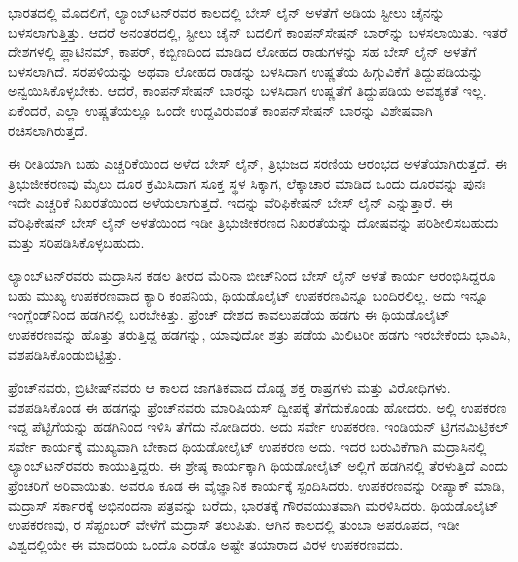 ಭಾರತದಲ್ಲಿ ಮೊದಲಿಗೆ, ಲ್ಯಾಂಬ್​ಟನ್​ರವರ ಕಾಲದಲ್ಲಿ ಬೇಸ್​ ಲೈನ್​ ಅಳತೆಗೆ  ಅಡಿಯ ಸ್ಟೀಲು ಚೈನನ್ನು ಬಳಸಲಾಗುತ್ತಿತ್ತು. ಆದರೆ ಅನಂತರದಲ್ಲಿ, ಸ್ಟೀಲು ಚೈನ್​ ಬದಲಿಗೆ ಕಾಂಪನ್​ಸೇಷನ್​ ಬಾರ್​ನ್ನು ಬಳಸಲಾಯಿತು. ಇತರೆ ದೇಶಗಳಲ್ಲಿ ಪ್ಲಾಟಿನಮ್, ಕಾಪರ್​, ಕಬ್ಬಿಣದಿಂದ ಮಾಡಿದ ಲೋಹದ ರಾಡುಗಳನ್ನು ಸಹ ಬೇಸ್​ ಲೈನ್​ ಅಳತೆಗೆ ಬಳಸಲಾಗಿದೆ. ಸರಪಳಿಯನ್ನು ಅಥವಾ ಲೋಹದ ರಾಡನ್ನು ಬಳಸಿದಾಗ ಉಷ್ಣತೆಯ ಹಿಗ್ಗುವಿಕೆಗೆ ತಿದ್ದುಪಡಿಯನ್ನು ಅನ್ವಯಿಸಿಕೊಳ್ಳಬೇಕು. ಆದರೆ, ಕಾಂಪನ್​ಸೇಷನ್​ ಬಾರನ್ನು ಬಳಸಿದಾಗ ಉಷ್ಣತೆಗೆ ತಿದ್ದುಪಡಿಯ ಅವಶ್ಯಕತೆ ಇಲ್ಲ. ಏಕೆಂದರೆ, ಎಲ್ಲಾ ಉಷ್ಣತೆಯಲ್ಲೂ ಒಂದೇ ಉದ್ದವಿರುವಂತೆ ಕಾಂಪನ್​ಸೇಷನ್​ ಬಾರನ್ನು ವಿಶೇಷವಾಗಿ ರಚಿಸಲಾಗಿರುತ್ತದೆ.

ಈ ರೀತಿಯಾಗಿ ಬಹು ಎಚ್ಚರಿಕೆಯಿಂದ ಅಳೆದ ಬೇಸ್​ ಲೈನ್​, ತ್ರಿಭುಜದ ಸರಣಿಯ ಆರಂಭದ ಅಳತೆಯಾಗಿರುತ್ತದೆ. ಈ ತ್ರಿಭುಜೀಕರಣವು  ಮೈಲು ದೂರ ಕ್ರಮಿಸಿದಾಗ ಸೂಕ್ತ ಸ್ಥಳ ಸಿಕ್ಕಾಗ, ಲೆಕ್ಕಾಚಾರ ಮಾಡಿದ ಒಂದು ದೂರವನ್ನು ಪುನಃ ಇದೇ ಎಚ್ಚರಿಕೆ ನಿಖರತೆಯಿಂದ ಅಳೆಯಲಾಗುತ್ತದೆ. ಇದನ್ನು ವೆರಿಫಿಕೇಷನ್​ ಬೇಸ್​ ಲೈನ್​ ಎನ್ನುತ್ತಾರೆ. ಈ ವೆರಿಫಿಕೇಷನ್​ ಬೇಸ್​ ಲೈನ್​ ಅಳತೆಯಿಂದ ಇಡೀ ತ್ರಿಭುಜೀಕರಣದ ನಿಖರತೆಯನ್ನು ದೋಷವನ್ನು ಪರಿಶೀಲಿಸಬಹುದು ಮತ್ತು ಸರಿಪಡಿಸಿಕೊಳ್ಳಬಹುದು.

ಲ್ಯಾಂಬ್​ಟನ್​ರವರು ಮದ್ರಾಸಿನ ಕಡಲ ತೀರದ ಮೆರಿನಾ ಬೀಚ್​ನಿಂದ ಬೇಸ್​ ಲೈನ್​ ಅಳತೆ ಕಾರ್ಯ ಆರಂಭಿಸಿದ್ದರೂ ಬಹು ಮುಖ್ಯ ಉಪಕರಣವಾದ ಕ್ಯಾರಿ ಕಂಪನಿಯ, ಥಿಯಡೊಲೈಟ್​ ಉಪಕರಣವಿನ್ನೂ ಬಂದಿರಲಿಲ್ಲ. ಅದು ಇನ್ನೂ ಇಂಗ್ಲೆಂಡ್​ನಿಂದ ಹಡಗಿನಲ್ಲಿ ಬರಬೇಕಿತ್ತು. ಫ್ರೆಂಚ್​ ದೇಶದ ಕಾವಲುಪಡೆಯ ಹಡಗು ಈ ಥಿಯಡೊಲೈಟ್​ ಉಪಕರಣವನ್ನು ಹೊತ್ತು ತರುತ್ತಿದ್ದ ಹಡಗನ್ನು, ಯಾವುದೋ ಶತ್ರು ಪಡೆಯ ಮಿಲಿಟರೀ ಹಡಗು ಇರಬೇಕೆಂದು ಭಾವಿಸಿ, ವಶಪಡಿಸಿಕೊಂಡುಬಿಟ್ಟಿತ್ತು.

ಫ್ರೆಂಚ್​ನವರು, ಬ್ರಿಟೀಷ್​ನವರು ಆ ಕಾಲದ ಜಾಗತಿಕವಾದ ದೊಡ್ಡ ಶಕ್ತ ರಾಷ್ರಗಳು ಮತ್ತು ವಿರೋಧಿಗಳು. ವಶಪಡಿಸಿಕೊಂಡ ಈ ಹಡಗನ್ನು ಫ್ರೆಂಚ್​ನವರು ಮಾರಿಷಿಯಸ್​ ದ್ವೀಪಕ್ಕೆ ತೆಗೆದುಕೊಂಡು ಹೋದರು. ಅಲ್ಲಿ ಉಪಕರಣ ಇದ್ದ ಪೆಟ್ಟಿಗೆಯನ್ನು ಹಡಗಿನಿಂದ ಇಳಿಸಿ ತೆಗೆದು ನೋಡಿದರು. ಅದು ಸರ್ವೇ ಉಪಕರಣ. ಇಂಡಿಯನ್​ ಟ್ರಿಗನಮಿಟ್ರಿಕಲ್​ ಸರ್ವೇ ಕಾರ್ಯಕ್ಕೆ ಮುಖ್ಯವಾಗಿ ಬೇಕಾದ ಥಿಯಡೋಲೈಟ್​ ಉಪಕರಣ ಅದು. ಇದರ ಬರುವಿಕೆಗಾಗಿ ಮದ್ರಾಸಿನಲ್ಲಿ ಲ್ಯಾಂಬ್​ಟನ್​ರವರು ಕಾಯುತ್ತಿದ್ದರು. ಈ ಶ್ರೇಷ್ಠ ಕಾರ್ಯಕ್ಕಾಗಿ ಥಿಯಡೋಲೈಟ್​ ಅಲ್ಲಿಗೆ ಹಡಗಿನಲ್ಲಿ ತೆರಳುತ್ತಿದೆ ಎಂದು ಫ್ರೆಂಚರಿಗೆ ಅರಿವಾಯಿತು. ಅವರೂ ಕೂಡ ಈ ವೈಜ್ಞಾನಿಕ ಕಾರ್ಯಕ್ಕೆ ಸ್ಪಂದಿಸಿದರು. ಉಪಕರಣವನ್ನು ರೀಪ್ಯಾಕ್​ ಮಾಡಿ, ಮದ್ರಾಸ್​ ಸರ್ಕಾರಕ್ಕೆ ಅಭಿನಂದನಾ ಪತ್ರವನ್ನು ಬರೆದು, ಭಾರತಕ್ಕೆ ಗೌರವಯುತವಾಗಿ ಮರಳಿಸಿದರು. ಥಿಯಡೊಲೈಟ್​ ಉಪಕರಣವು, ರ ಸೆಪ್ಟಂಬರ್​ ವೇಳೆಗೆ ಮದ್ರಾಸ್​ ತಲುಪಿತು. ಆಗಿನ ಕಾಲದಲ್ಲಿ ತುಂಬಾ ಅಪರೂಪದ, ಇಡೀ ವಿಶ್ವದಲ್ಲಿಯೇ ಈ ಮಾದರಿಯ ಒಂದೊ ಎರಡೊ ಅಷ್ಟೇ ತಯಾರಾದ ವಿರಳ ಉಪಕರಣವದು.


